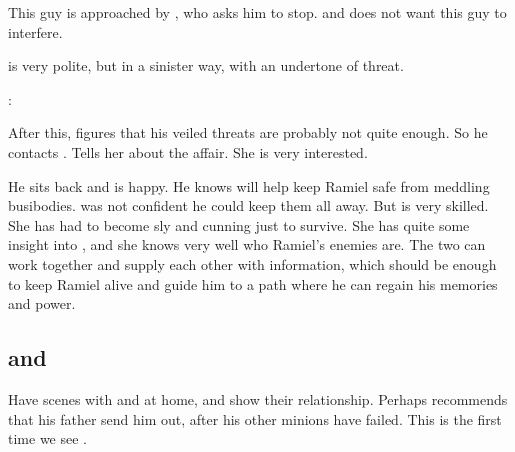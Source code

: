 This guy is approached by \Azraid, who asks him to stop. 
\Azraid{}  and does not want this guy to interfere. 

\Azraid{} is very polite, but in a sinister way, with an undertone of threat. 

\begin{prose}
  \Azraid:
\end{prose}

After this, \Azraid{} figures that his veiled threats are probably not quite enough. 
So he contacts \Cishiel. 
Tells her about the affair. 
She is very interested. 

He sits back and is happy.
He knows \Cishiel{} will help keep Ramiel safe from meddling \Mystraacht{} busibodies. 
\Azraid{} was not confident he could keep them all away. 
But \Cishiel{} is very skilled. 
She has had to become sly and cunning just to survive. 
She has quite some insight into \Mystraacht, and she knows very well who Ramiel's enemies are. 
The two can work together and supply each other with information, which should be enough to keep Ramiel alive and guide him to a path where he can regain his memories and power. 










\subsection{\Vizsherioch{} and \Secherdamon}
Have scenes with \Vizsherioch{} and \Secherdamon{} at home, and show their relationship. 
Perhaps \Vizsherioch{} recommends that his father send him out, after his other minions have failed. This is the first time we see \Vizsherioch. 









